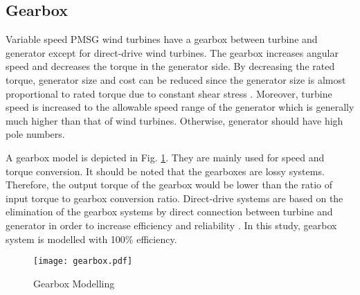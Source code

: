 \subsection{Gearbox}  
Variable speed PMSG wind turbines have a gearbox between turbine and generator except for direct-drive wind turbines. The gearbox increases angular speed and decreases the torque in the generator side. By decreasing the rated torque, generator size and cost can be reduced since the generator size is almost proportional to rated torque due to constant shear stress \cite{Polinder2013aa}. Moreover, turbine speed is increased to the allowable speed range of the generator which is generally much higher than that of wind turbines. Otherwise, generator should have high pole numbers. \par
A gearbox model is depicted in Fig. \ref{gearboxmodel}. They are mainly used for speed and torque conversion. It should be noted that the gearboxes are lossy systems. Therefore, the output torque of the gearbox would be lower than the ratio of input torque to gearbox conversion ratio. Direct-drive systems are based on the elimination of the gearbox systems by direct connection between turbine and generator in order to increase efficiency and reliability \cite{Chen2009b}. In this study, gearbox system is modelled with 100\% efficiency. 
\begin{figure}[h!]
	\centering
	\texttt{[image: gearbox.pdf]}
	\caption{Gearbox Modelling}
	\label{gearboxmodel}
\end{figure}
